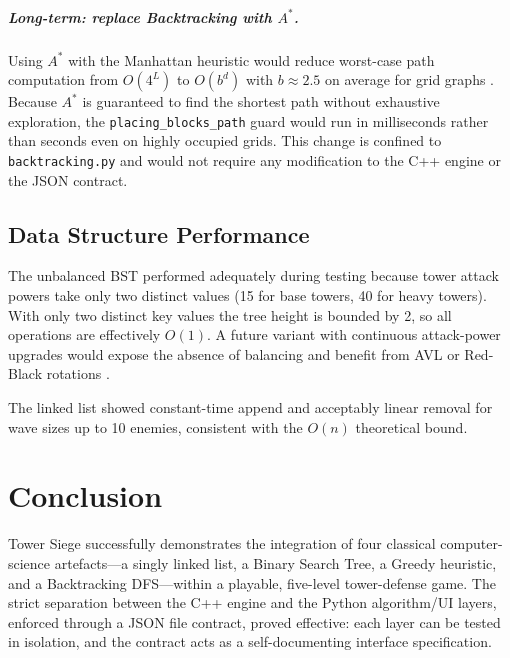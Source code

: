 \documentclass[12pt,a4paper]{report}
\begin{document}
\paragraph{Long-term: replace Backtracking with $A^*$.}
Using $A^*$ with the Manhattan heuristic would reduce worst-case path
computation from $O(4^L)$ to $O(b^d)$ with $b \approx 2.5$ on average
for grid graphs \cite{hart1968astar}.
Because $A^*$ is guaranteed to find the shortest path without exhaustive
exploration, the \texttt{placing\_blocks\_path} guard would run in
milliseconds rather than seconds even on highly occupied grids.
This change is confined to \texttt{backtracking.py} and would not require
any modification to the C++ engine or the JSON contract.

\section{Data Structure Performance}

The unbalanced BST performed adequately during testing because tower attack
powers take only two distinct values (15 for base towers, 40 for heavy towers).
With only two distinct key values the tree height is bounded by 2, so all
operations are effectively $O(1)$.
A future variant with continuous attack-power upgrades would expose the
absence of balancing and benefit from AVL or Red-Black rotations
\cite{cormen2022algorithms}.

The linked list showed constant-time append and acceptably linear removal for
wave sizes up to 10 enemies, consistent with the $O(n)$ theoretical bound.

\chapter{Conclusion}
\label{ch:conclusion}

Tower Siege successfully demonstrates the integration of four classical
computer-science artefacts---a singly linked list, a Binary Search Tree,
a Greedy heuristic, and a Backtracking DFS---within a playable, five-level
tower-defense game.
The strict separation between the C++ engine and the Python algorithm/UI
layers, enforced through a JSON file contract, proved effective: each layer
can be tested in isolation, and the contract acts as a self-documenting
interface specification.
\end{document}
